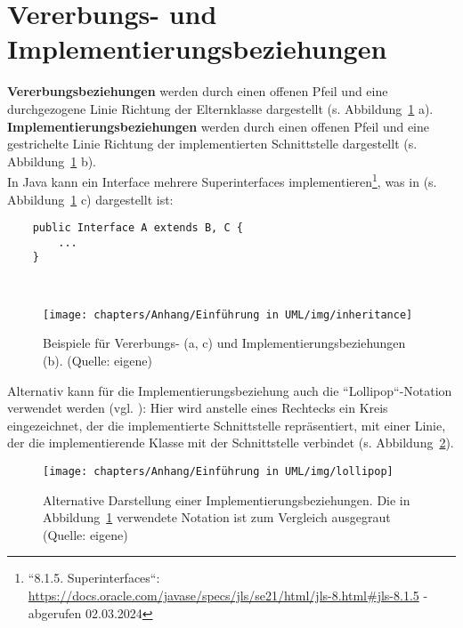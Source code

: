 \section{Vererbungs- und Implementierungsbeziehungen}

\textbf{Vererbungsbeziehungen} werden durch einen offenen Pfeil und eine durchgezogene Linie Richtung der Elternklasse dargestellt (s. Abbildung~\ref{fig:inheritance} a).\\

\textbf{Implementierungsbeziehungen} werden durch einen offenen Pfeil und eine gestrichelte Linie Richtung der implementierten Schnittstelle dargestellt (s. Abbildung~\ref{fig:inheritance} b).\\

In Java kann ein Interface mehrere Superinterfaces implementieren\footnote{
    ``8.1.5. Superinterfaces``: \url{https://docs.oracle.com/javase/specs/jls/se21/html/jls-8.html#jls-8.1.5} - abgerufen 02.03.2024
}, was in (s. Abbildung~\ref{fig:inheritance} c) dargestellt ist:\\

\begin{verbatim}
    public Interface A extends B, C {
        ...
    }
\end{verbatim}\\

\begin{figure}
    \centering
    \texttt{[image: chapters/Anhang/Einführung in UML/img/inheritance]}
    \caption{Beispiele für Vererbungs- (a, c) und Implementierungsbeziehungen (b). (Quelle: eigene)}
    \label{fig:inheritance}
\end{figure}

\noindent
Alternativ kann für die Implementierungsbeziehung auch die ``Lollipop``-Notation verwendet werden (vgl. \cite[71]{Fow03b}): Hier wird anstelle eines Rechtecks ein Kreis eingezeichnet, der die implementierte Schnittstelle repräsentiert, mit einer Linie, der die implementierende Klasse mit der Schnittstelle verbindet (s. Abbildung~\ref{fig:lollipop}).


\begin{figure}
    \centering
    \texttt{[image: chapters/Anhang/Einführung in UML/img/lollipop]}
    \caption{Alternative Darstellung einer Implementierungsbeziehungen. Die in Abbildung~\ref{fig:inheritance} verwendete Notation ist zum Vergleich ausgegraut (Quelle: eigene)}
    \label{fig:lollipop}
\end{figure}


